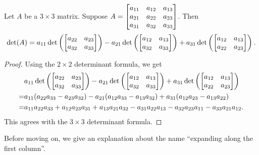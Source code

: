 \begin{theorem}
	 Let $A$ be a $3\times 3$
	matrix. Suppose $A=\mat{a_{11} & a_{12} & a_{13} \\ a_{21} & a_{22} & a_{23} \\ a_{31} & a_{32} & a_{33}}$.
	Then
	\[
		\det(A)=a_{11}\det\left(\mat{a_{22} & a_{23} \\ a_{32} & a_{33}}\right)-a_{21}\det\left(\mat{a_{12} & a_{13} \\ a_{32} & a_{33}}\right)+a_{31}\det\left(\mat{a_{12} & a_{13} \\ a_{22} & a_{23}}\right).
	\]
\end{theorem}
\begin{proof}
	Using the $2\times 2$ determinant formula, we get
	\begin{align*}
		  & a_{11}\det\left(\mat{a_{22} & a_{23} \\ a_{32} & a_{33}}\right)-a_{21}\det\left(\mat{a_{12} & a_{13} \\ a_{32} & a_{33}}\right)+a_{31}\det\left(\mat{a_{12} & a_{13} \\ a_{22} & a_{23}}\right) \\
		= & a_{11}(a_{22}a_{33}-a_{23}a_{32})-a_{21}(a_{12}a_{33}-a_{13}a_{32})+a_{31}(a_{12}a_{23}-a_{13}a_{22})                                                                                           \\
		= & a_{11}a_{22}a_{33}+a_{12}a_{23}a_{31}+a_{13}a_{21}a_{32}-a_{31}a_{22}a_{13}-a_{32}a_{23}a_{11}-a_{33}a_{21}a_{12}.
	\end{align*}
	This agrees with the $3\times 3$ determinant formula.
\end{proof}

Before moving on, we give an explanation about the name ``expanding along the
first column''.

